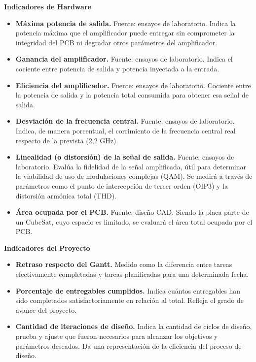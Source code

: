 \textbf{Indicadores de Hardware}
\begin{itemize}
    \item \textbf{Máxima potencia de salida.} Fuente: ensayos de laboratorio. Indica la potencia máxima que el amplificador puede entregar sin comprometer la integridad del PCB ni degradar otros parámetros del amplificador.
    \item \textbf{Ganancia del amplificador.} Fuente: ensayos de laboratorio. Indica el cociente entre potencia de salida y potencia inyectada a la entrada.
    \item \textbf{Eficiencia del amplificador.} Fuente: ensayos de laboratorio. Cociente entre la potencia de salida y la potencia total consumida para obtener esa señal de salida.
    \item \textbf{Desviación de la frecuencia central.} Fuente: ensayos de laboratorio. Indica, de manera porcentual, el corrimiento de la frecuencia central real respecto de la prevista (2,2 GHz).
    \item \textbf{Linealidad (o distorsión) de la señal de salida.} Fuente: ensayos de laboratorio. Evalúa la fidelidad de la señal amplificada, útil para determinar la viabilidad de uso de modulaciones complejas (QAM). Se medirá a través de parámetros como el punto de intercepción de tercer orden (OIP3) y la distorsión armónica total (THD).
    \item \textbf{Área ocupada por el PCB.} Fuente: diseño CAD. Siendo la placa parte de un CubeSat, cuyo espacio es limitado, se evaluará el área total ocupada por el PCB.
\end{itemize}

\textbf{Indicadores del Proyecto}
\begin{itemize}
    \item \textbf{Retraso respecto del Gantt.} Medido como la diferencia entre tareas efectivamente completadas y tareas planificadas para una determinada fecha.
    \item \textbf{Porcentaje de entregables cumplidos.} Indica cuántos entregables han sido completados satisfactoriamente en relación al total. Refleja el grado de avance del proyecto.
    \item \textbf{Cantidad de iteraciones de diseño.} Indica la cantidad de ciclos de diseño, prueba y ajuste que fueron necesarios para alcanzar los objetivos y parámetros deseados. Da una representación de la eficiencia del proceso de diseño.
\end{itemize}

